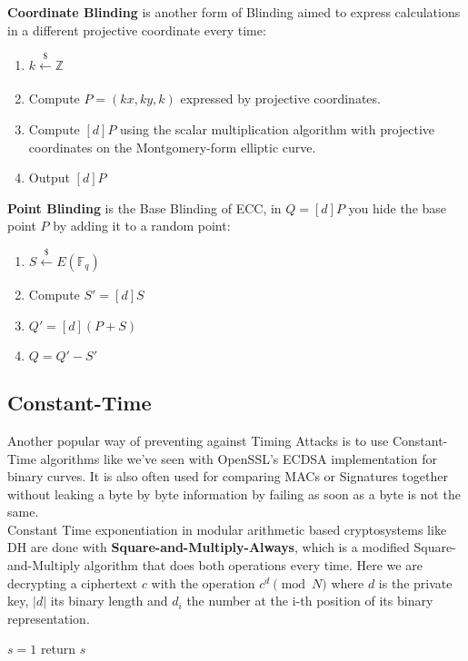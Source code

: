 \documentclass[a4paper,11pt]{article}
\begin{document}
\textbf{Coordinate Blinding} is another form of Blinding aimed to express calculations in a different projective coordinate every time:

\begin{enumerate}
\item{$k \xleftarrow[]{\$} \mathbb{Z}$}
\item{Compute $P = (kx, ky, k)$ expressed by projective coordinates.}
\item{Compute $[d]P$ using the scalar multiplication algorithm with projective coordinates on the Montgomery-form elliptic curve.}
\item{Output $[d]P$}
\end{enumerate}

\textbf{Point Blinding} is the Base Blinding of ECC, in $Q = [d]P$ you hide the base point $P$ by adding it to a random point:

\begin{enumerate}
\item{$S \xleftarrow[]{\$} E(\mathbb{F}_q)$}
\item{Compute $S' = [d]S$}
\item{$Q' = [d](P + S)$}
\item{$Q = Q' - S'$}
\end{enumerate}

\subsection{Constant-Time}

Another popular way of preventing against Timing Attacks is to use Constant-Time algorithms like we've seen with OpenSSL's ECDSA implementation for binary curves. It is also often used for comparing MACs or Signatures together without leaking a byte by byte information by failing as soon as a byte is not the same.\\

Constant Time exponentiation in modular arithmetic based cryptosystems like DH are done with \textbf{Square-and-Multiply-Always}, which is a modified Square-and-Multiply algorithm that does both operations every time. Here we are decrypting a ciphertext $c$ with the operation $c^d \pmod{N}$ where $d$ is the private key, $|d|$ its binary length and $d_i$ the number at the i-th position of its binary representation.

\DontPrintSemicolon
\begin{algorithm}[H]
    $s = 1$\;
    return $s$\;
\end{algorithm}
\end{document}

